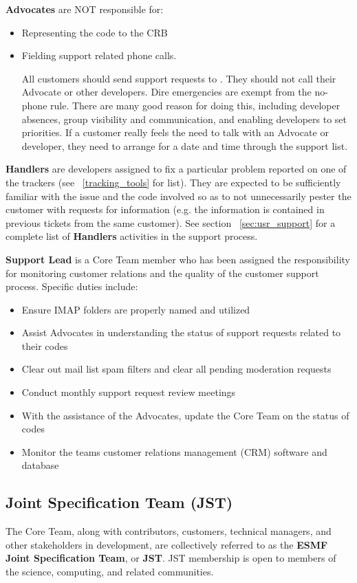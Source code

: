 {\bf Advocates} are NOT responsible for:
\begin{itemize}
\item Representing the code to the CRB
\item Fielding support related phone calls.

All customers should send support requests to .
They should not call their Advocate or other developers.  Dire emergencies are exempt from the no-phone rule. 
There are many good reason for doing this, including developer absences, group visibility and communication,
and enabling developers to set priorities.  If a customer really feels the need to talk with an
Advocate or developer, they need to arrange for a date and time through the support list.
\end {itemize}

{\bf Handlers} are developers assigned to fix a particular problem reported on one of the trackers (see 
~\ref{tracking_tools} for list). They are expected to be sufficiently familiar with the issue and the
code involved so as to not unnecessarily pester the customer with requests for information (e.g. the
information is contained in previous tickets from the same customer). See section ~\ref{sec:usr_support} for
a complete list of {\bf Handlers} activities in the support process.  

{\bf Support Lead} is a Core Team member who has been assigned the responsibility for monitoring customer relations and the quality of the customer support process. Specific duties include:
\begin{itemize}
\item Ensure IMAP folders are properly named and utilized
\item Assist Advocates in understanding the status of support requests related to their codes
\item Clear out mail list spam filters and clear all pending moderation requests
\item Conduct monthly support request review meetings
\item With the assistance of the Advocates, update the Core Team on the status of codes
\item Monitor the teams customer relations management (CRM) software and database
\end{itemize}

\subsection{Joint Specification Team (JST)}
The Core Team, along with contributors, customers, technical
managers, and other stakeholders in development, are collectively
referred to as the {\bf ESMF Joint Specification Team}, or {\bf JST}.  
JST membership is open to members of the science, computing, and
related communities.


